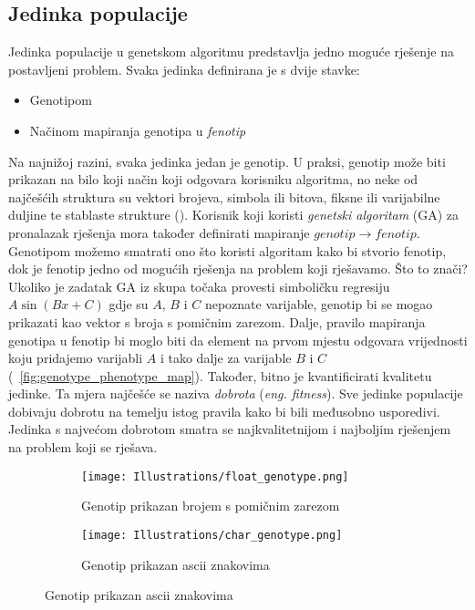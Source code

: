 \subsection{Jedinka populacije}
Jedinka populacije u genetskom algoritmu predstavlja jedno moguće rješenje na postavljeni problem.
Svaka jedinka definirana je s dvije stavke:
\begin{itemize}
	\item{Genotipom}
	\item{Načinom mapiranja genotipa u \emph{fenotip}}
\end{itemize}
Na najnižoj razini, svaka jedinka jedan je genotip. 
U praksi, genotip može biti prikazan na bilo koji način koji odgovara korisniku algoritma, no neke od najčešćih struktura su vektori brojeva, simbola ili bitova, fiksne ili varijabilne duljine te stablaste strukture (\cite{naturally_selecting_algorithms}).
Korisnik koji koristi \emph{genetski algoritam} (GA) za pronalazak rješenja mora također definirati mapiranje $genotip \rightarrow fenotip$.
Genotipom možemo smatrati ono što koristi algoritam kako bi stvorio fenotip, dok je fenotip jedno od mogućih rješenja na problem koji rješavamo.
Što to znači?
Ukoliko je zadatak GA iz skupa točaka provesti simboličku regresiju $A\sin(Bx + C)$ gdje su $A$, $B$ i $C$ nepoznate varijable, genotip bi se mogao prikazati kao vektor s broja s pomičnim zarezom.
Dalje, pravilo mapiranja genotipa u fenotip bi moglo biti da element na prvom mjestu odgovara vrijednosti koju pridajemo varijabli $A$ i tako dalje za varijable $B$ i $C$ (~\ref{fig:genotype_phenotype_map}).
Također, bitno je kvantificirati kvalitetu jedinke.
Ta mjera najčešće se naziva \emph{dobrota} (\emph{eng. fitness}).
Sve jedinke populacije dobivaju dobrotu na temelju istog pravila kako bi bili međusobno usporedivi.
Jedinka s najvećom dobrotom smatra se najkvalitetnijom i najboljim rješenjem na problem koji se rješava.

\begin{figure}
	\caption{Mogućnosti spremanja i korištenja genotipa tijekom izvođenja genetskog algoritma}
	\begin{subfigure}[t]{0.45\textwidth}
		\texttt{[image: Illustrations/float\_genotype.png]}
		\caption{Genotip prikazan brojem s pomičnim zarezom}
	\end{subfigure}
	\hspace{\fill}
	\begin{subfigure}[t]{0.45\textwidth}
		\texttt{[image: Illustrations/char\_genotype.png]}
		\caption{Genotip prikazan ascii znakovima}
	\end{subfigure}
	\label{fig:genotype_types}
\end{figure}

